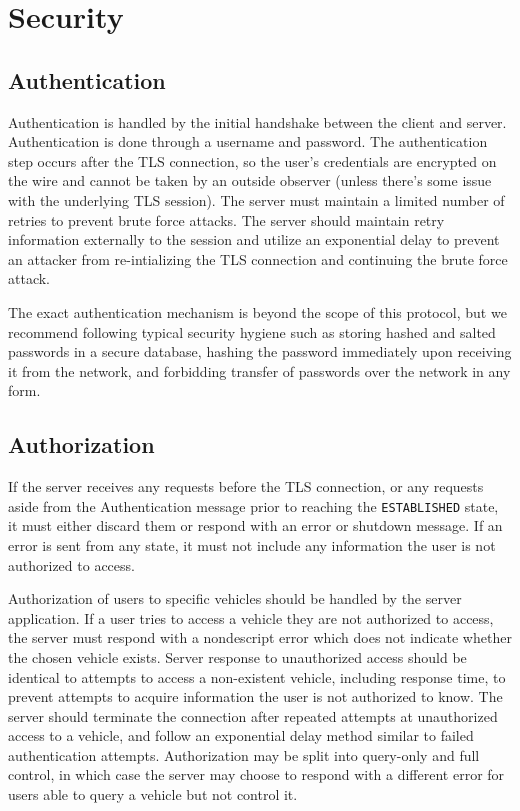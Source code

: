 \section{Security}
\label{sec:security}

\subsection{Authentication}
\label{sec:security:autht}
Authentication is handled by the initial handshake between the client and server. Authentication is done through a username and password. The authentication step occurs after the TLS connection, so the user's credentials are encrypted on the wire and cannot be taken by an outside observer (unless there's some issue with the underlying TLS session). The server must maintain a limited number of retries to prevent brute force attacks. The server should maintain retry information externally to the session and utilize an exponential delay to prevent an attacker from re-intializing the TLS connection and continuing the brute force attack. 

The exact authentication mechanism is beyond the scope of this protocol, but we recommend following typical security hygiene such as storing hashed and salted passwords in a secure database, hashing the password immediately upon receiving it from the network, and forbidding transfer of passwords over the network in any form.

\subsection{Authorization}
\label{sec:security:authz}
If the server receives any requests before the TLS connection, or any requests aside from the Authentication message prior to reaching the \texttt{ESTABLISHED} state, it must either discard them or respond with an error or shutdown message. If an error is sent from any state, it must not include any information the user is not authorized to access.

Authorization of users to specific vehicles should be handled by the server application. If a user tries to access a vehicle they are not authorized to access, the server must respond with a nondescript error which does not indicate whether the chosen vehicle exists. Server response to unauthorized access should be identical to attempts to access a non-existent vehicle, including response time, to prevent attempts to acquire information the user is not authorized to know. The server should terminate the connection after repeated attempts at unauthorized access to a vehicle, and follow an exponential delay method similar to failed authentication attempts. Authorization may be split into query-only and full control, in which case the server may choose to respond with a different error for users able to query a vehicle but not control it.

